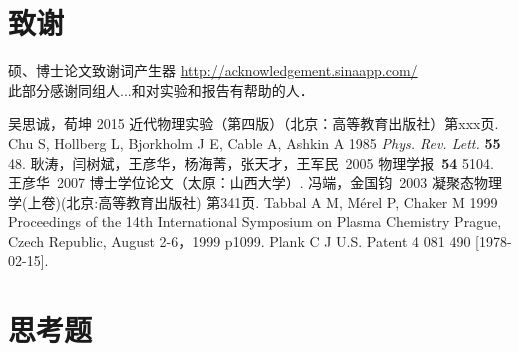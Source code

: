 \documentclass[aps,pre,12pt,preprint,onecolumn,showpacs,showkeys]{revtex4-1}
\begin{document}
\section{致谢}
硕、博士论文致谢词产生器 \href{http://acknowledgement.sinaapp.com/}{http://acknowledgement.sinaapp.com/}\\
此部分感谢同组人...和对实验和报告有帮助的人．
%
\begin{thebibliography}{}
 吴思诚，荀坤 2015 近代物理实验（第四版）（北京：高等教育出版社）第xxx页.
%
 Chu S, Hollberg L, Bjorkholm J E, Cable A, Ashkin A 1985 {\it Phys. Rev. Lett.} {\bf 55} 48.%
 耿涛，闫树斌，王彦华，杨海菁，张天才，王军民~2005 物理学报~{\bf 54} 5104.%
 王彦华~2007 博士学位论文（太原：山西大学）.%
 冯端，金国钧~2003 凝聚态物理学(上卷)(北京:高等教育出版社) 第341页.%
 Tabbal A M, Mérel P, Chaker M 1999 Proceedings of the 14th International Symposium on Plasma Chemistry Prague, Czech Republic, August 2-6，1999 p1099.%
 Plank C J U.S. Patent 4 081 490 [1978-02-15].%
%
\end{thebibliography}

\clearpage
\appendix
\section{思考题}
\end{document}
